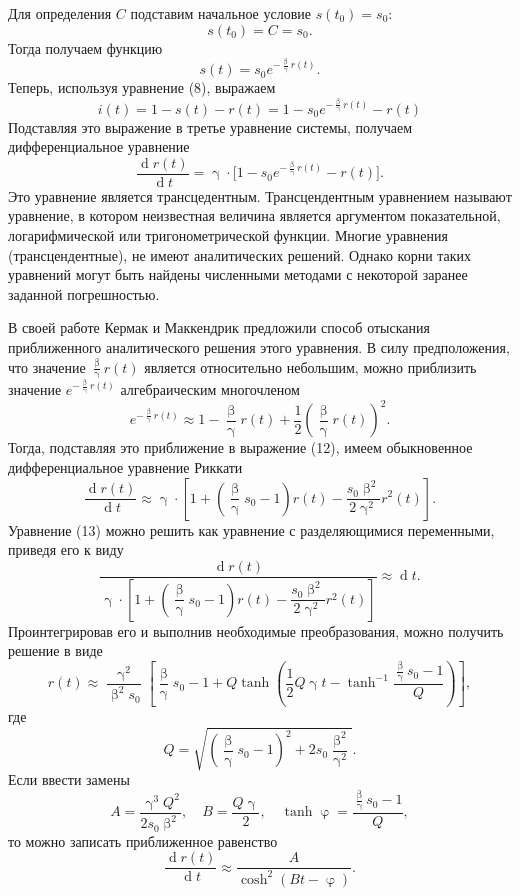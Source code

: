 \documentclass[a4paper, 12pt]{extarticle}
\numberwithin{equation}{section}
\renewcommand{\beta}{\upbeta}
\renewcommand{\gamma}{\upgamma}
\renewcommand{\varphi}{\upvarphi}
\renewcommand{\d}{\operatorname{d}}
\begin{document}
	Для определения $C$ подставим начальное условие $s(t_0) = s_0$:
	$$s(t_0) = C = s_0.$$
	Тогда получаем функцию 
	\begin{equation}
		s(t) = s_0 e^{-\frac \beta \gamma r(t)}.
	\end{equation}
	Теперь, используя уравнение (8), выражаем 
	\begin{equation}
		i(t) = 1 - s(t) - r(t) = 1 - s_0 e^{-\frac \beta \gamma r(t)} - r(t)
	\end{equation}
	Подставляя это выражение в третье уравнение системы, получаем дифференциальное уравнение 
	\begin{equation}
		\dfrac{\d r(t)}{\d t} = \gamma\cdot \big[1 - s_0 e^{-\frac \beta \gamma r(t)} - r(t)\big].
	\end{equation}
	Это уравнение является трансцедентным. Трансцендентным уравнением называют уравнение, в котором неизвестная величина является аргументом показательной, логарифмической или тригонометрической функции. Многие уравнения (трансцендентные), не имеют аналитических решений. Однако корни таких уравнений могут быть найдены численными методами с некоторой заранее заданной погрешностью.
	
	В своей работе Кермак и Маккендрик предложили способ отыскания приближенного аналитического решения этого уравнения. В силу предположения, что значение $\frac{\beta}{\gamma} r(t)$ является относительно небольшим, можно приблизить значение $e^{-\frac \beta \gamma r(t)}$ алгебраическим многочленом $$e^{-\frac \beta \gamma r(t)} \approx 1 - \frac \beta \gamma r(t) + \dfrac12\left(\dfrac\beta\gamma r(t)\right)^2.$$
	Тогда, подставляя это приближение в выражение (12), имеем обыкновенное дифференциальное уравнение Риккати 
	\begin{equation}
		\dfrac{\d r(t)}{\d t} \approx \gamma\cdot \left[1 + \left(\dfrac\beta\gamma s_0 - 1\right)r(t) - \dfrac{s_0\beta ^2}{2 \gamma ^2}r^2(t)\right].
	\end{equation}
	Уравнение (13) можно решить как уравнение с разделяющимися переменными, приведя его к виду 
	$$\dfrac{\d r(t)}{\gamma\cdot \left[1 + \left(\dfrac\beta\gamma s_0 - 1\right)r(t) - \dfrac{s_0\beta ^2}{2 \gamma ^2}r^2(t)\right]} \approx \d t.$$
	Проинтегрировав его и выполнив необходимые преобразования, можно получить решение в виде
	\begin{equation}
		r(t)\approx \dfrac{\gamma^2}{\beta^2 s_0}\left[\dfrac{\beta}{\gamma}s_0 - 1 + Q \tanh \left(\dfrac 12Q \gamma t - \tanh^{-1}\dfrac{\frac \beta \gamma s_0 - 1}{Q} \right)\right],
	\end{equation}
	где $$Q = \sqrt{\left(\dfrac \beta \gamma s_0 - 1\right)^2 + 2s_0\dfrac{\beta^2}{\gamma^2}}.$$
	Если ввести замены $$A = \dfrac{\gamma^3 Q^2}{2 s_0 \beta^2},\quad B = \dfrac{Q \gamma }{2},\quad \tanh \varphi = \dfrac{\frac \beta \gamma s_0 - 1}Q,$$
	то можно записать приближенное равенство 
	\begin{equation}
		\dfrac{\d r(t)}{\d t} \approx \dfrac{A}{\cosh^2 (Bt - \varphi)}.
	\end{equation}
\end{document}
